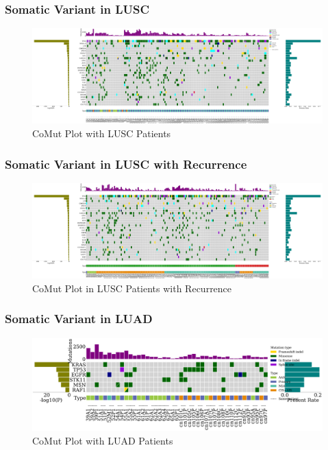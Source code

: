 \documentclass{beamer}
\begin{document}
    \begin{frame}
        \frametitle{Somatic Variant in LUSC}

        \begin{figure}
            \includegraphics[width=\linewidth]{figures/Mutect2/BWA-SQC.pdf}
            \caption{CoMut Plot with LUSC Patients}
        \end{figure}
    \end{frame}

    \begin{frame}
        \frametitle{Somatic Variant in LUSC with Recurrence}

        \begin{figure}
            \includegraphics[width=\linewidth]{figures/Mutect2/BWA-SQC.Recur.pdf}
            \caption{CoMut Plot in LUSC Patients with Recurrence}
        \end{figure}
    \end{frame}

    \begin{frame}
        \frametitle{Somatic Variant in LUAD}

        \begin{figure}
            \includegraphics[width=\linewidth]{figures/Mutect2/BWA-ADC.pdf}
            \caption{CoMut Plot with LUAD Patients}
        \end{figure}
    \end{frame}
\end{document}
